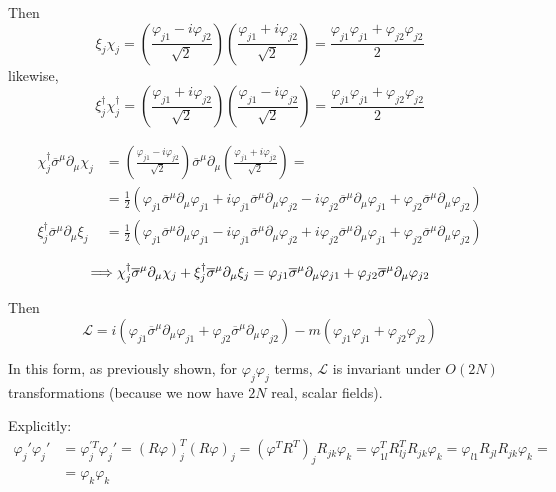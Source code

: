 \documentclass[twoside]{amsart}
\begin{document}
\begin{itemize}
Then
\[
\xi_j \chi_j = \left( \frac{ \varphi_{j1} - i \varphi_{j2} }{ \sqrt{2}} \right) \left( \frac{ \varphi_{j1} + i \varphi_{j2} }{ \sqrt{2}} \right)  = \frac{ \varphi_{j1} \varphi_{j1} + \varphi_{j2} \varphi_{j2} }{ 2} 
\]
likewise,
\[
\xi_j^{\dag} \chi_j^{\dag} = \left( \frac{ \varphi_{j1} + i \varphi_{j2} }{ \sqrt{2}} \right) \left( \frac{ \varphi_{j1} - i \varphi_{j2} }{ \sqrt{2}} \right)  = \frac{ \varphi_{j1} \varphi_{j1} + \varphi_{j2} \varphi_{j2} }{ 2} 
\]

\[
\begin{aligned}
  \chi_j^{\dag} \overline{\sigma}^{\mu} \partial_{\mu} \chi_j & =  \left( \frac{ \varphi_{j1} - i \varphi_{j2} }{ \sqrt{2}} \right) \overline{\sigma}^{\mu} \partial_{\mu} \left( \frac{ \varphi_{j1} + i \varphi_{j2} }{ \sqrt{2}} \right)  = \\
  & = \frac{1}{2} \left( \varphi_{j1} \overline{\sigma}^{\mu} \partial_{\mu} \varphi_{j1} + i \varphi_{j1} \overline{\sigma}^{\mu} \partial_{\mu}\varphi_{j2} - i \varphi_{j2} \overline{\sigma}^{\mu} \partial_{\mu} \varphi_{j1} + \varphi_{j2} \overline{\sigma}^{\mu} \partial_{\mu} \varphi_{j2} \right) \\
  \xi_j^{\dag} \overline{\sigma}^{\mu} \partial_{\mu} \xi_j & =   \frac{1}{2} \left( \varphi_{j1} \overline{\sigma}^{\mu} \partial_{\mu} \varphi_{j1} - i \varphi_{j1} \overline{\sigma}^{\mu} \partial_{\mu}\varphi_{j2} + i \varphi_{j2} \overline{\sigma}^{\mu} \partial_{\mu} \varphi_{j1} + \varphi_{j2} \overline{\sigma}^{\mu} \partial_{\mu} \varphi_{j2} \right)
\end{aligned}
\]

\[
\Longrightarrow   \chi_j^{\dag} \overline{\sigma}^{\mu} \partial_{\mu} \chi_j     +   \xi_j^{\dag} \overline{\sigma}^{\mu} \partial_{\mu} \xi_j  = \\
\varphi_{j1} \overline{\sigma}^{\mu} \partial_{\mu} \varphi_{j1} + \varphi_{j2} \overline{\sigma}^{\mu} \partial_{\mu} \varphi_{j2}
\]

Then
\[
\mathcal{L} = i (\varphi_{j1} \overline{\sigma}^{\mu} \partial_{\mu} \varphi_{j1}  + \varphi_{j2} \overline{\sigma}^{\mu} \partial_{\mu} \varphi_{j2} ) - m (\varphi_{j1} \varphi_{j1} + \varphi_{j2} \varphi_{j2} ) 
\]

In this form, as previously shown, for $\varphi_j \varphi_j$ terms, $\mathcal{L}$ is invariant under $O(2N)$ transformations (because we now have $2N$ real, scalar fields).  

Explicitly:
\[
\begin{aligned}
  \varphi_j' \varphi_j' & = \varphi^{' T}_j \varphi_j' = (R\varphi)^T_j (R\varphi)_j = (\varphi^T R^T)_j R_{jk} \varphi_k = \varphi_{1l}^T R_{lj}^T R_{jk} \varphi_k = \varphi_{l1} R_{jl} R_{jk} \varphi_k = \\
  & = \varphi_k \varphi_k
\end{aligned}
\]


\end{itemize}
\end{document}
